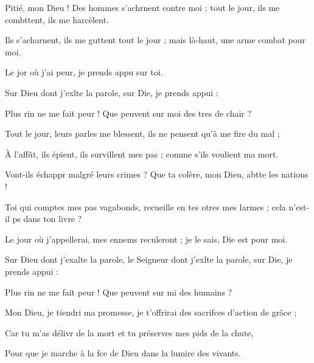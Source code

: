 \item Pitié, mon Dieu ! Des hommes s’achrnent contre moi ;\psstar{} tout le jour, ils me combttent, ils me harcèlent.
\item Ils s’acharnent, ils me guttent tout le jour ;\psstar{} mais là-haut, une arme combat pour moi.
\item Le jor où j’ai peur,\psstar{} je prends appu sur toi.
\item Sur Dieu dont j’exlte la parole,\psstar{} sur Die, je prends appui :
\item Plus rin ne me fait peur !\psstar{} Que peuvent sur moi des tres de chair ?
\item Tout le jour, leurs parles me blessent,\psstar{} ils ne pensent qu’à me fire du mal ;
\item À l’affût, ils épient, ils survillent mes pas ;\psstar{} comme s’ils voulient ma mort.
\item Vont-ils échappr malgré leurs crimes ?\psstar{} Que ta colère, mon Dieu, abtte les nations !
\item Toi qui comptes mes pas vagabonds,\pscross{} recueille en tes otres mes larmes ;\psstar{} cela n’est-il ps dans ton livre ?
\item Le jour où j’appellerai, mes ennems reculeront ;\psstar{} je le sais, Die est pour moi.
\item Sur Dieu dont j’exalte la parole,\pscross{} le Seigneur dont j’exlte la parole,\psstar{} sur Die, je prends appui : 
\item Plus rin ne me fait peur !\psstar{} Que peuvent sur mi des humains ?
\item Mon Dieu, je tiendri ma promesse,\psstar{} je t’offrirai des sacrifces d’action de grâce ;
\item Car tu m’as délivr de la mort\psstar{} et tu préserves mes pids de la chute, 
\item Pour que je marche à la fce de Dieu\psstar{} dans la lumire des vivants.